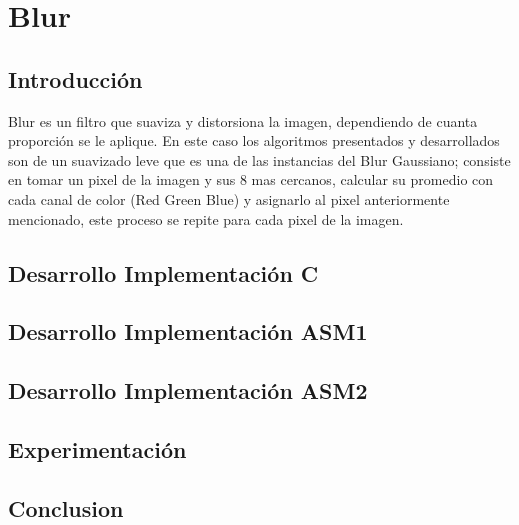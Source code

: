 \documentclass[10pt, a4paper,english,spanish]{article}
\begin{document}
\section{Blur}
\subsection{Introducción}
Blur es un filtro que suaviza y distorsiona la imagen, dependiendo de cuanta proporción se le aplique. En este caso los algoritmos presentados y desarrollados son de un suavizado leve que es una de las instancias del Blur Gaussiano; consiste en tomar un pixel de la imagen y sus 8 mas cercanos, calcular su promedio con cada canal de color (Red Green Blue) y asignarlo al pixel anteriormente mencionado, este proceso se repite para cada pixel de la imagen. 

\newpage
\subsection{Desarrollo Implementación C}

\newpage
\subsection{Desarrollo Implementación ASM1}

\newpage
\subsection{Desarrollo Implementación ASM2}

\newpage
\subsection{Experimentación}

\newpage
\subsection{Conclusion}
\end{document}
